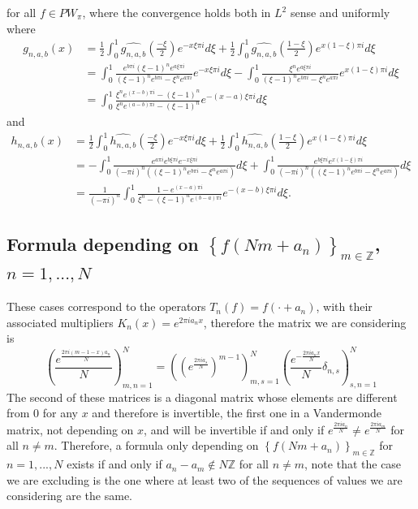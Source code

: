 \documentclass[reqno]{amsart}
\theoremstyle{plain}
\theoremstyle{definition}
\numberwithin{equation}{section}
\newcommand{\Z}{{\mathbb Z}}
\newcommand{\pa}[1]{\left(#1\right)}
\newcommand{\suc}[1]{\left\{#1\right\}}
\begin{document}
for all $f\in PW_\pi$, where the convergence holds both in $L^2$ sense and uniformly where
\begin{align*}
    g_{n,a,b}(x) 
    &=\frac{1}{2} \int_0^1 \widehat{g_{n,a,b}}\pa{\frac{-\xi}{2}} e^{-x \xi \pi i} d\xi 
    + \frac{1}{2} \int_0^1 \widehat{g_{n,a,b}}\pa{\frac{1-\xi}{2}} e^{x (1-\xi) \pi i} d\xi \\
    &=\int_0^1 \frac{e^{b\pi i} (\xi-1)^n e^{a \xi \pi i}}{(\xi-1)^n e^{b \pi i} - \xi^n e^{a \pi i}} e^{-x \xi \pi i} d\xi 
    -\int_0^1 \frac{\xi^n e^{a \xi \pi i}}{(\xi-1)^n e^{b \pi i} - \xi^n e^{a \pi i}} e^{x (1-\xi) \pi i} d\xi \\
    &= \int_0^1 \frac{\xi^n e^{(x-b) \pi i} - (\xi-1)^n}{\xi^n e^{(a-b) \pi i} - (\xi-1)^n } e^{-(x-a) \xi \pi i} d\xi 
\end{align*}
and
\begin{align*}
    h_{n,a,b}(x)
    &=\frac{1}{2} \int_0^1 \widehat{h_{n,a,b}}\pa{\frac{-\xi}{2}} e^{-x \xi \pi i} d\xi 
    + \frac{1}{2} \int_0^1 \widehat{h_{n,a,b}}\pa{\frac{1-\xi}{2}} e^{x (1-\xi) \pi i} d\xi \\
    &=-\int_0^1 \frac{e^{a\pi i} e^{b \xi \pi i} e^{-x \xi \pi i}}
    {(-\pi i)^n \pa{(\xi-1)^n e^{b \pi i} - \xi^n e^{a \pi i}}} d\xi 
    +\int_0^1 \frac{e^{b \xi \pi i} e^{x (1-\xi) \pi i}}{(-\pi i)^n \pa{(\xi-1)^n e^{b \pi i} - \xi^n e^{a \pi i}}} d\xi \\
    &=\frac{1}{(-\pi i)^n} \int_0^1 \frac{1-e^{(x-a)\pi i}}{\xi^n - (\xi-1)^ne^{(b-a) \pi i}} e^{-(x-b) \xi \pi i} d\xi.
\end{align*}

\subsection{Formula depending on $\suc{f(Nm+a_n)}_{m\in\Z}$, $n=1,...,N$}
These cases correspond to the operators $T_n(f)=f(\cdot+a_n)$, with their associated multipliers 
$K_n(x)=e^{2\pi i a_n x}$, therefore the matrix we are considering is
$$\pa{\frac{e^\frac{2\pi i (m-1-x) a_n}{N}}{N}}_{m,n=1}^N
= \pa{\pa{e^\frac{2\pi i a_s}{N}}^{m-1}}_{m,s=1}^N \pa{\frac{e^{-\frac{2\pi i a_n x}{N}}}{N}\delta_{n,s}}_{s,n=1}^N$$
The second of these matrices is a diagonal matrix whose elements are different from 0 for any $x$ and therefore is invertible, the first one in a Vandermonde matrix, not depending on $x$, and will be invertible if and only if $e^\frac{2\pi i a_n}{N}\neq e^\frac{2\pi i a_m}{N}$ for all $n\neq m$. Therefore, a formula only depending on $\suc{f(Nm+a_n)}_{m\in\Z}$ for $n=1,...,N$ exists if and only if $a_n-a_m\notin N\Z$ for all $n\neq m$, note that the case we are excluding is the one where at least two of the sequences of values we are considering are the same. \\
\end{document}
